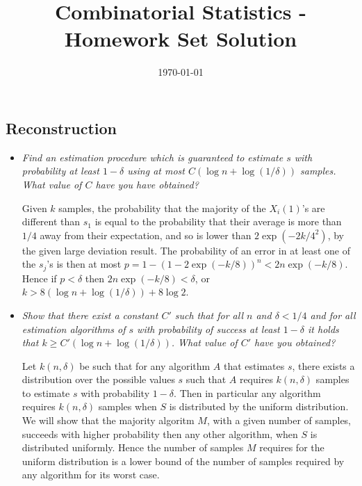 \documentclass[11pt]{article} \usepackage{amssymb}
\begin{document}
\title{Combinatorial Statistics - Homework Set Solution}

\date{\today}
\maketitle
\subsection{Reconstruction}
\begin{itemize}
\item
{\em Find an estimation procedure which is guaranteed to estimate $s$ with probability at least $1-\delta$ using at most
$C (\log n + \log (1/\delta))$ samples. What value of $C$ have you have obtained?
}

Given $k$ samples, the probability that the majority of  the $X_i(1)$'s are 
different than $s_1$ is equal to the probability that their average is more than
$1/4$ away from their expectation, and so
is lower than $2\exp(-2k/4^2)$, by the given large deviation result. 
The probability of an error in at least one of the $s_j$'s is then at most
$p=1-(1-2\exp(-k/8))^n<2n\exp(-k/8)$. Hence if 
$p<\delta$ then $2n\exp(-k/8)<\delta$, or $k>8\left(\log n+\log(1/\delta)\right)+8\log 2$.

\item
{\em Show that there exist a constant $C'$ such that for all $n$ and $\delta < 1/4$ and for all estimation algorithms of $s$ with
probability of success at least $1-\delta$ it holds that $k \geq C'( \log n + \log (1/\delta))$.
What value of $C'$ have you obtained?
 }

Let $k(n,\delta)$ be such that for any algorithm $A$ that estimates $s$, there
exists a distribution over the possible values $s$ such that $A$ requires
$k(n,\delta)$ samples to estimate $s$ with probability $1-\delta$. Then in particular any 
algorithm requires $k(n,\delta)$ samples when $S$ is distributed by the uniform 
distribution. We will show that the majority algoritm $M$, with a given number
of samples, succeeds with higher probability then any other algorithm,
when $S$ is distributed
uniformly. Hence the number of samples $M$ requires for the uniform distribution
is a lower bound of the number of samples required by any algorithm for its
worst case. 


\end{itemize}
\end{document}
